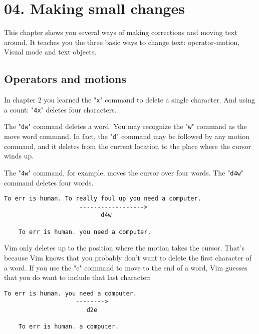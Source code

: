 \section{04. Making small changes}
This chapter shows you several ways of making corrections and moving text
around.  It teaches you the three basic ways to change text: operator-motion,
Visual mode and text objects.
\localtableofcontents
\subsection{Operators and motions}

In chapter 2 you learned the "\texttt{x}" command to delete a single character.
And using a count: "\texttt{4x}" deletes four characters.

The "\texttt{dw}" command deletes a word.
You may recognize the "\texttt{w}" command as the move word command.
In fact, the "\texttt{d}" command may be followed by any motion command, and it deletes from the current location to the place where the cursor winds up.

The "\texttt{4w}" command, for example, moves the cursor over four words.
The "\texttt{d4w}" command deletes four words.

\begin{Verbatim}[samepage=true]
    To err is human. To really foul up you need a computer. 
                     ------------------>
                           d4w

    To err is human. you need a computer. 
\end{Verbatim}

Vim only deletes up to the position where the motion takes the cursor.
That's because Vim knows that you probably don't want to delete the first character of a word.
If you use the "e" command to move to the end of a word, Vim guesses that you do want to include that last character:

\begin{Verbatim}[samepage=true]
    To err is human. you need a computer. 
                    -------->
                       d2e

    To err is human. a computer. 
\end{Verbatim}


